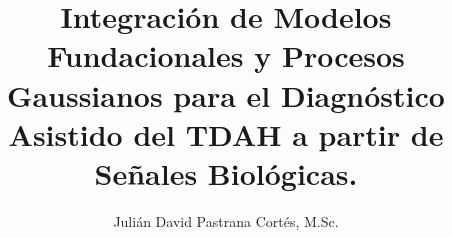 \usepackage[es-tabla]{babel}
\usepackage{parskip}
\usepackage[capitalise, noabbrev]{cleveref}



\title{
	\textbf{
		Integración de Modelos Fundacionales y Procesos Gaussianos para el Diagnóstico Asistido del TDAH a partir de Señales Biológicas.
	}
	}
\author{
	Julián David Pastrana Cortés, M.Sc.
	}


\date{}